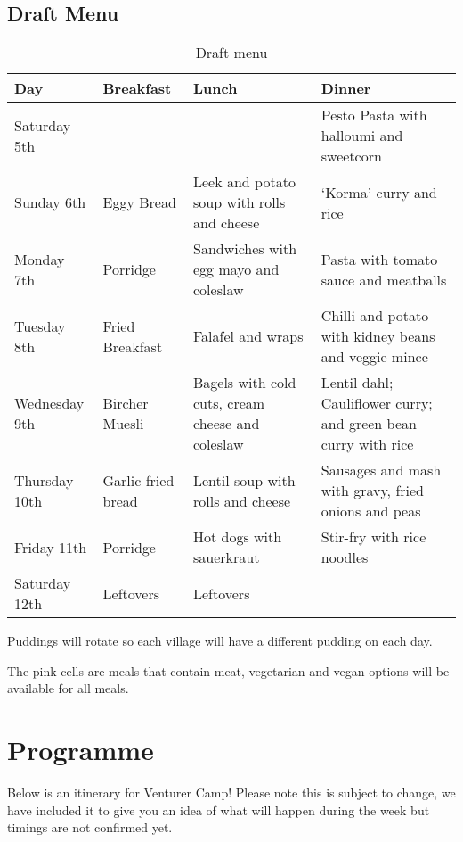\documentclass[a4paper, 11pt]{report}
\newcommand{\nl}{\newline}
\begin{document}
\section{Draft Menu}
\begin{table}[H]
    \centering
    {\RaggedRight
    \begin{tabular}{p{} p{} p{} p{}}
        \textbf{Day} & \textbf{Breakfast} & \textbf{Lunch} & \textbf{Dinner}\\
        \hline
        Saturday 5th & \cellcolor{gray!25} & \cellcolor{gray!25} & Pesto Pasta with halloumi and sweetcorn\\
        \hline
        Sunday 6th & Eggy Bread & Leek and potato soup with rolls and cheese & `Korma' curry and rice \\
        \hline
        Monday 7th & Porridge & Sandwiches with egg mayo and coleslaw & \cellcolor{red!25} Pasta with tomato sauce and meatballs\\
        \hline
        Tuesday 8th & Fried Breakfast & Falafel and wraps & Chilli and potato with kidney beans and veggie mince \\
        \hline
        Wednesday 9th & Bircher Muesli & \cellcolor{red!25} Bagels with cold cuts, cream cheese and coleslaw & Lentil dahl; Cauliflower curry; and green bean curry with rice\\
        \hline
        Thursday 10th & Garlic fried bread & Lentil soup with rolls and cheese & \cellcolor{red!25} Sausages and mash with gravy, fried onions and peas\\
        \hline
        Friday 11th & Porridge & \cellcolor{red!25} Hot dogs with sauerkraut & Stir-fry with rice noodles\\
        \hline
        Saturday 12th & Leftovers & Leftovers & \cellcolor{gray!25}\\
        \hline
    \end{tabular}
    }%
    \caption{Draft menu}
\end{table}
Puddings will rotate so each village will have a different pudding on each day.\nl

The pink cells are meals that contain meat, vegetarian and vegan options will be available for all meals.

\chapter{Programme}
Below is an itinerary for Venturer Camp! Please note this is subject to change, we have included it to give you an idea of what will happen during the week but timings are not confirmed yet. \nl
\end{document}
